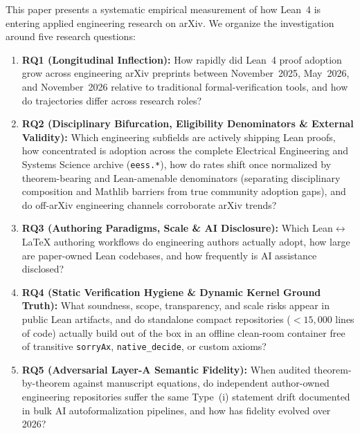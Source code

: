 \documentclass[11pt,letterpaper]{article}
\begin{document}
This paper presents a systematic empirical measurement of how Lean~4 is entering applied engineering research on arXiv. We organize the investigation around five research questions:
\begin{enumerate}
  \item \textbf{RQ1 (Longitudinal Inflection):} How rapidly did Lean~4 proof adoption grow across engineering arXiv preprints between November~2025, May~2026, and November~2026 relative to traditional formal-verification tools, and how do trajectories differ across research roles?
  \item \textbf{RQ2 (Disciplinary Bifurcation, Eligibility Denominators \& External Validity):} Which engineering subfields are actively shipping Lean proofs, how concentrated is adoption across the complete Electrical Engineering and Systems Science archive (\texttt{eess.*}), how do rates shift once normalized by theorem-bearing and Lean-amenable denominators (separating disciplinary composition and Mathlib barriers from true community adoption gaps), and do off-arXiv engineering channels corroborate arXiv trends?
  \item \textbf{RQ3 (Authoring Paradigms, Scale \& AI Disclosure):} Which Lean$\leftrightarrow$\LaTeX{} authoring workflows do engineering authors actually adopt, how large are paper-owned Lean codebases, and how frequently is AI assistance disclosed?
  \item \textbf{RQ4 (Static Verification Hygiene \& Dynamic Kernel Ground Truth):} What soundness, scope, transparency, and scale risks appear in public Lean artifacts, and do standalone compact repositories ($<15{,}000$ lines of code) actually build out of the box in an offline clean-room container free of transitive \texttt{sorryAx}, \texttt{native\_decide}, or custom axioms?
  \item \textbf{RQ5 (Adversarial Layer-A Semantic Fidelity):} When audited theorem-by-theorem against manuscript equations, do independent author-owned engineering repositories suffer the same Type~(i) statement drift documented in bulk AI autoformalization pipelines, and how has fidelity evolved over 2026?
\end{enumerate}
\end{document}
